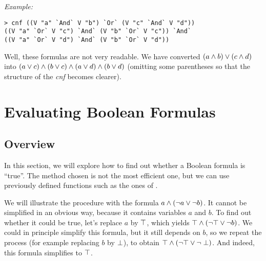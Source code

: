 \documentclass[english]{article}
\begin{document}
\noindent
\emph{Example:}
\begin{lstlisting}
> cnf ((V "a" `And` V "b") `Or` (V "c" `And` V "d"))
((V "a" `Or` V "c") `And` (V "b" `Or` V "c")) `And`
((V "a" `Or` V "d") `And` (V "b" `Or` V "d"))
\end{lstlisting}

Well, these formulas are not very readable. We have converted $(a \land b) \lor (c \land d)$ into
$(a \lor c) \land (b \lor c) \land (a \lor d) \land (b \lor d)$ (omitting some
parentheses so that the structure of the \emph{cnf} becomes clearer).


\section{Evaluating Boolean Formulas}\label{sec:evaluating}

\subsection{Overview}\label{sec:evaluating_overview}

In this section, we will explore how to find out whether a Boolean formula
is ``true''. The method chosen is not the most efficient one, but we can use
previously defined functions such as the ones of .

We will illustrate the procedure with the formula $a \land (\lnot a \lor \lnot b)$. It
cannot be simplified in an obvious way, because it contains variables $a$ and
$b$. To find out whether it could be true, let's replace $a$ by $\top$, which
yields $\top \land (\lnot \top \lor \lnot b)$. We could in principle simplify
this formula, but it still depends on $b$, so we repeat the process (for
example replacing $b$ by $\perp$), to obtain $\top \land (\lnot \top \lor \lnot
\perp)$. And indeed, this formula simplifies to $\top$.
\end{document}
